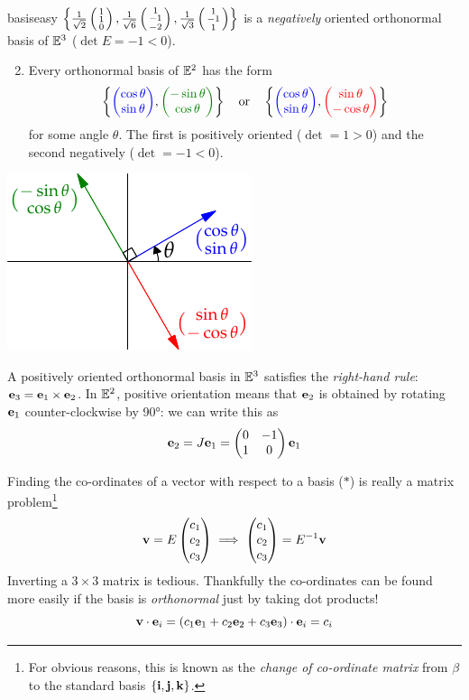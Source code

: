 \begin{examples}{}{basiseasy}
	\exstart $\left\{\frac 1{\sqrt 2}\left(\begin{smallmatrix}1\\1\\0\end{smallmatrix}\right),\frac 1{\sqrt 6}\left(\begin{smallmatrix}1\\-1\\-2\end{smallmatrix}\right),\frac 1{\sqrt 3}\left(\begin{smallmatrix}1\\-1\\1\end{smallmatrix}\right)\right\}$ is a \emph{negatively} oriented orthonormal basis of $\mathbb{E}^3$ ($\det E=-1<0$).\par
	\begin{minipage}[t]{0.7\linewidth}\vspace{0pt}
	\begin{enumerate}\setcounter{enumi}{1}
	  \item Every orthonormal basis of $\mathbb{E}^2$ has the form
	  \[
	  	\left\{\textcolor{blue}{\twovec{\cos\theta}{\sin\theta}},\textcolor{Green}{\twovec{-\sin\theta}{\cos\theta}}\right\} \quad\text{or}\quad \left\{\textcolor{blue}{\twovec{\cos\theta}{\sin\theta}},\textcolor{red}{\twovec{\sin\theta}{-\cos\theta}}\right\}
	  \]
	  for some angle $\theta$. The first is positively oriented ($\det=1>0$) and the second negatively ($\det =-1<0$).
	\end{enumerate}
	\end{minipage}\hfill\begin{minipage}[t]{0.29\linewidth}\vspace{0pt}
		\flushright\includegraphics{moving-orthe2}
	\end{minipage}
\end{examples}

A positively oriented orthonormal basis in $\mathbb{E}^3$ satisfies the \emph{right-hand rule}: ${\mathbf{e}}_3={\mathbf{e}}_1\times{\mathbf{e}}_2$. In $\mathbb{E}^2$, positive orientation means that ${\mathbf{e}}_2$ is obtained by rotating ${\mathbf{e}}_1$ counter-clockwise by \ang{90}: we can write this as
\[
	{\mathbf{e}}_2=J{\mathbf{e}}_1=
	\begin{pmatrix}
		0&-1\\1&0
	\end{pmatrix}
	{\mathbf{e}}_1
\]

Finding the co-ordinates of a vector with respect to a basis ($\ast$) is really a matrix problem\footnote{For obvious reasons, this is known as the \emph{change of co-ordinate matrix} from $\beta$ to the standard basis $\{{\mathbf{i}},{\mathbf{j}},{\mathbf{k}}\}$.}
\[
	{\mathbf{v}}=E\begin{pmatrix}c_1\\c_2\\c_3\end{pmatrix} \implies \begin{pmatrix}c_1\\c_2\\c_3\end{pmatrix} =E^{-1}{\mathbf{v}}
\]
Inverting a $3\times 3$ matrix is tedious. Thankfully the co-ordinates can be found more easily if the basis is \emph{orthonormal} just by taking dot products!
\[
	{\mathbf{v}}\cdot{\mathbf{e}}_i =(c_1{\mathbf{e}}_1+c_2{\mathbf{e}}_2+c_3{\mathbf{e}}_3)\cdot {\mathbf{e}}_i =c_i
\]

